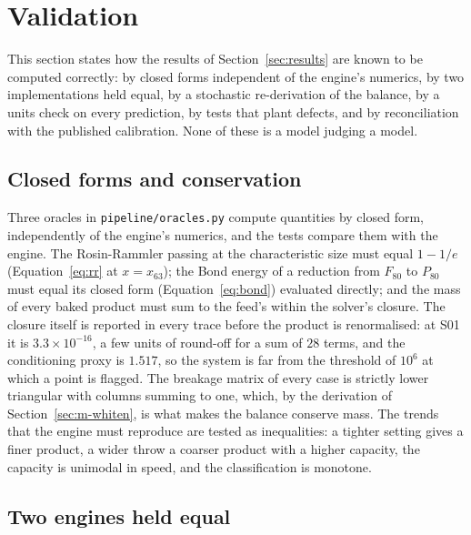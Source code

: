 \section{Validation}\label{sec:validation}

This section states how the results of Section~\ref{sec:results} are known to be computed correctly: by closed forms independent of the engine's
numerics, by two implementations held equal, by a stochastic re-derivation of the balance, by a units check on every prediction, by tests that plant
defects, and by reconciliation with the published calibration. None of these is a model judging a model.

\subsection{Closed forms and conservation}\label{sec:val-oracles}

Three oracles in \texttt{pipeline/\allowbreak{}oracles.py} compute quantities by closed form, independently of the engine's numerics, and the tests compare them with
the engine. The Rosin-Rammler passing at the characteristic size must equal $1-1/e$ (Equation~\eqref{eq:rr} at $x=x_{63}$); the Bond energy of a reduction
from $F_{80}$ to $P_{80}$ must equal its closed form (Equation~\eqref{eq:bond}) evaluated directly; and the mass of every baked product must sum to the
feed's within the solver's closure. The closure itself is reported in every trace before the product is renormalised: at S01 it is $3.3\times10^{-16}$, a few
units of round-off for a sum of $28$ terms, and the conditioning proxy is $1.517$, so the system is far from the threshold of $10^{6}$ at which a point is
flagged. The breakage matrix of every case is strictly lower triangular with columns summing to one, which, by the derivation of
Section~\ref{sec:m-whiten}, is what makes the balance conserve mass. The trends that the engine must reproduce are tested as inequalities: a tighter setting
gives a finer product, a wider throw a coarser product with a higher capacity, the capacity is unimodal in speed, and the classification is monotone.

\subsection{Two engines held equal}\label{sec:val-parity}

